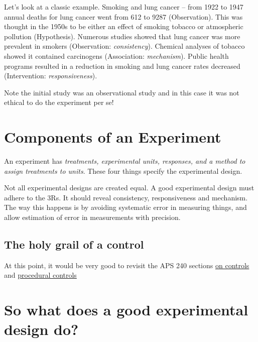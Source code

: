 \documentclass[
]{book}
\begin{document}
Let's look at a classic example. Smoking and lung cancer -- from 1922 to 1947 annual deaths for lung cancer went from 612 to 9287 (Observation). This was thought in the 1950s to be either an effect of smoking tobacco or atmospheric pollution (Hypothesis). Numerous studies showed that lung cancer was more prevalent in smokers (Observation: \emph{consistency}). Chemical analyses of tobacco showed it contained carcinogens (Association: \emph{mechanism}). Public health programs resulted in a reduction in smoking and lung cancer rates decreased (Intervention: \emph{responsiveness}).

Note the initial study was an observational study and in this case it was not ethical to do the experiment per se!

\hypertarget{components-of-an-experiment}{%
\section{Components of an Experiment}\label{components-of-an-experiment}}

An experiment has \emph{treatments, experimental units, responses, and a method to assign treatments to units}. These four things specify the experimental design.

Not all experimental designs are created equal. A good experimental design must adhere to the 3Rs. It should reveal consistency, responsiveness and mechanism. The way this happens is by avoiding systematic error in measuring things, and allow estimation of error in measurements with precision.

\hypertarget{the-holy-grail-of-a-control}{%
\subsection{The holy grail of a control}\label{the-holy-grail-of-a-control}}

At this point, it would be very good to revisit the APS 240 sections \href{https://dzchilds.github.io/stats-for-bio/principles-experimental-design.html\#experimental-control}{on controls} and \href{https://dzchilds.github.io/stats-for-bio/principles-experimental-design.html\#EXPT-DESIGN-PROCEDURAL-CONTROLS}{procedural controls}

\hypertarget{so-what-does-a-good-experimental-design-do}{%
\section{So what does a good experimental design do?}\label{so-what-does-a-good-experimental-design-do}}
\end{document}
